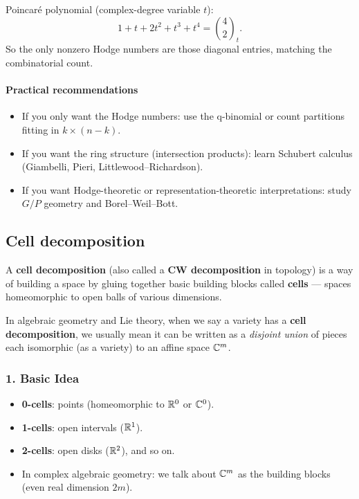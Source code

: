 \documentclass{amsart}
\let\originalmathbb\mathbb
\renewcommand{\mathbb}[1]{%
    \ifstrequal{#1}{1}{\mathbbm{#1}}{\originalmathbb{#1}}%
}
\theoremstyle{plain}
\theoremstyle{definition}
\theoremstyle{remark}
\begin{document}
Poincaré polynomial (complex-degree variable $t$):
\[
1 + t + 2t^2 + t^3 + t^4 = \binom{4}{2}_t.
\]
So the only nonzero Hodge numbers are those diagonal entries, matching the combinatorial count.

\paragraph{Practical recommendations}

\begin{itemize}
	\item If you only want the Hodge numbers: use the q-binomial or count partitions fitting in $k\times(n-k)$.
	\item If you want the ring structure (intersection products): learn Schubert calculus (Giambelli, Pieri, Littlewood–Richardson).
	\item If you want Hodge-theoretic or representation-theoretic interpretations: study $G/P$ geometry and Borel–Weil–Bott.
\end{itemize}


\subsection{Cell decomposition}

A \textbf{cell decomposition} (also called a \textbf{CW decomposition} in topology) is a way of building a space by gluing together basic building blocks called \textbf{cells} — spaces homeomorphic to open balls of various dimensions.

In algebraic geometry and Lie theory, when we say a variety has a \textbf{cell decomposition}, we usually mean it can be written as a \textit{disjoint union} of pieces each isomorphic (as a variety) to an affine space $\mathbb{C}^m$.

\subsubsection{1. \textbf{Basic Idea}}

\begin{itemize}
	\item \textbf{0-cells}: points (homeomorphic to $\mathbb{R}^0$ or $\mathbb{C}^0$).
	\item \textbf{1-cells}: open intervals ($\mathbb{R}^1$).
	\item \textbf{2-cells}: open disks ($\mathbb{R}^2$), and so on.
	\item In complex algebraic geometry: we talk about $\mathbb{C}^m$ as the building blocks (even real dimension $2m$).
\end{itemize}
\end{document}
